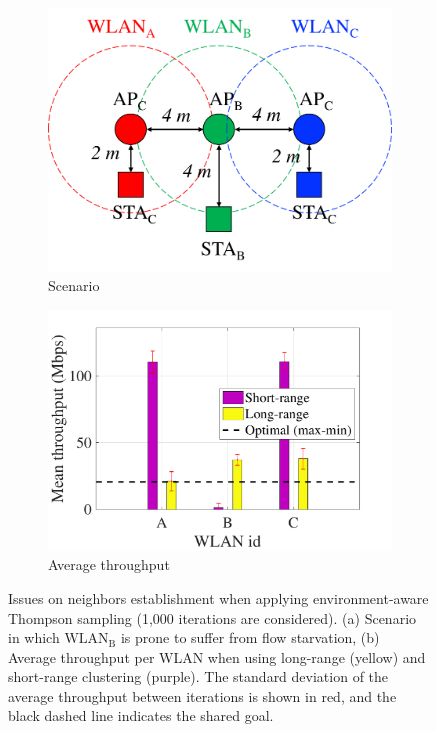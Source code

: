 \documentclass[preprint,12pt]{elsarticle}
\begin{document}
\begin{figure}[h!]
	\centering   		
	\begin{subfigure}[b]{0.35\textwidth}
		\includegraphics[width=\textwidth]{s3_new}
		\caption{Scenario}
		\label{fig:informed_s2}
	\end{subfigure}
	\begin{subfigure}[b]{0.4\textwidth}
		\includegraphics[width=\textwidth]{clustering_additive_interference}
		\caption{Average throughput}
		\label{fig:clustering_additive_interference}
	\end{subfigure}
	\caption{Issues on neighbors establishment when applying environment-aware Thompson sampling (1,000 iterations are considered). (a) Scenario in which $\text{WLAN}_\text{B}$ is prone to suffer from flow starvation, (b) Average throughput per WLAN when using long-range (yellow) and short-range clustering (purple). The standard deviation of the average throughput between iterations is shown in red, and the black dashed line indicates the shared goal.}
	\label{fig:clustering_issues}
\end{figure}   	
\end{document}
